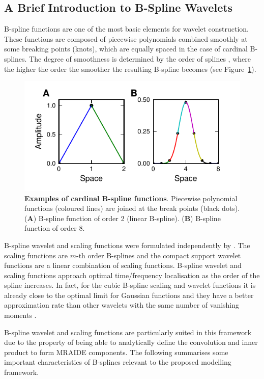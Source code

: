 \documentclass[review,authoryear,3p]{elsarticle}
\begin{document}
\subsection{A Brief Introduction to B-Spline Wavelets}
B-spline functions are one of the most basic elements for wavelet construction. These functions are composed of piecewise polynomials combined smoothly at some breaking points (knots), which are equally spaced in the case of cardinal B-splines. The degree of smoothness is determined by the order of splines \citep{Goswami1999}, where the higher the order the smoother the resulting B-spline becomes (see Figure~\ref{fig:Figure0}).
\begin{figure}[!t]
\centering
\includegraphics{./Graph/Figure0.pdf}
\caption{{\bf Examples of cardinal B-spline functions}. Piecewise polynomial functions (coloured lines) are joined at the break points (black dots). (\textbf{A}) B-spline function of order 2 (linear B-spline). (\textbf{B}) B-spline function of order 8.}
\label{fig:Figure0}
\end{figure}
 
B-spline wavelet and scaling functions were formulated independently by \citet{Chui1992b,Chui1992,Unser1993}.  The scaling functions are $m$-th order B-splines and the compact support wavelet functions are a linear combination of scaling functions. B-spline wavelet and scaling functions approach optimal time/frequency localisation as the order of the spline increases. In fact, for the cubic B-spline scaling and wavelet functions it is already close to the optimal limit for Gaussian functions and they have a better approximation rate than other wavelets with the same number of vanishing moments \citep{Unser1999}. 

B-spline wavelet and scaling functions are particularly suited in this framework due to the property of being able to analytically define the convolution and inner product to form MRAIDE components. The following summarises some important characteristics of B-splines relevant to the proposed modelling framework. 
\end{document}
